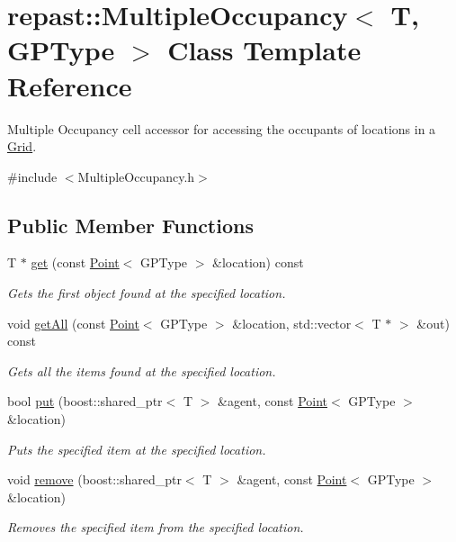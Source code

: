 \hypertarget{classrepast_1_1_multiple_occupancy}{\section{repast\-:\-:Multiple\-Occupancy$<$ T, G\-P\-Type $>$ Class Template Reference}
\label{classrepast_1_1_multiple_occupancy}
}


Multiple Occupancy cell accessor for accessing the occupants of locations in a \hyperlink{classrepast_1_1_grid}{Grid}.  




{\ttfamily \#include $<$Multiple\-Occupancy.\-h$>$}

\subsection*{Public Member Functions}
\begin{DoxyCompactItemize}
\item 
T $\ast$ \hyperlink{classrepast_1_1_multiple_occupancy_a114ed9e8e0707ec58c59e00a19c91120}{get} (const \hyperlink{classrepast_1_1_point}{Point}$<$ G\-P\-Type $>$ \&location) const 
\begin{DoxyCompactList}\small\item\em Gets the first object found at the specified location. \end{DoxyCompactList}\item 
void \hyperlink{classrepast_1_1_multiple_occupancy_a31bc44963d75d962c2bcd19bf35372b4}{get\-All} (const \hyperlink{classrepast_1_1_point}{Point}$<$ G\-P\-Type $>$ \&location, std\-::vector$<$ T $\ast$ $>$ \&out) const 
\begin{DoxyCompactList}\small\item\em Gets all the items found at the specified location. \end{DoxyCompactList}\item 
bool \hyperlink{classrepast_1_1_multiple_occupancy_a693c2e8f70c75aa8f9da75585f3a7d0c}{put} (boost\-::shared\-\_\-ptr$<$ T $>$ \&agent, const \hyperlink{classrepast_1_1_point}{Point}$<$ G\-P\-Type $>$ \&location)
\begin{DoxyCompactList}\small\item\em Puts the specified item at the specified location. \end{DoxyCompactList}\item 
void \hyperlink{classrepast_1_1_multiple_occupancy_ac22c02d438f233e55b695cf704bfe521}{remove} (boost\-::shared\-\_\-ptr$<$ T $>$ \&agent, const \hyperlink{classrepast_1_1_point}{Point}$<$ G\-P\-Type $>$ \&location)
\begin{DoxyCompactList}\small\item\em Removes the specified item from the specified location. \end{DoxyCompactList}\end{DoxyCompactItemize}


